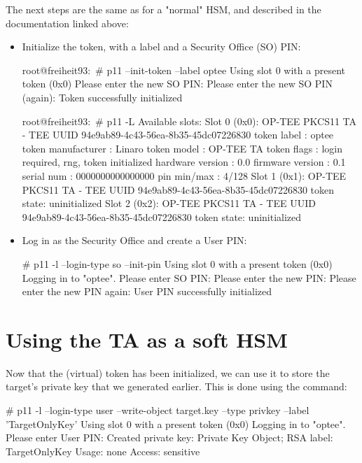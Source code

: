 The next steps are the same as for a "normal" HSM, and described in the documentation linked above:
\begin{itemize}
\item Initialize the token, with a label and a Security Office (SO) PIN:
\begin{bashinput}
root@freiheit93:~# p11 --init-token --label optee
Using slot 0 with a present token (0x0)
Please enter the new SO PIN: 
Please enter the new SO PIN (again): 
Token successfully initialized

root@freiheit93:~# p11 -L
Available slots:
Slot 0 (0x0): OP-TEE PKCS11 TA - TEE UUID 94e9ab89-4c43-56ea-8b35-45dc07226830
  token label        : optee
  token manufacturer : Linaro
  token model        : OP-TEE TA
  token flags        : login required, rng, token initialized
  hardware version   : 0.0
  firmware version   : 0.1
  serial num         : 0000000000000000
  pin min/max        : 4/128
Slot 1 (0x1): OP-TEE PKCS11 TA - TEE UUID 94e9ab89-4c43-56ea-8b35-45dc07226830
  token state:   uninitialized
Slot 2 (0x2): OP-TEE PKCS11 TA - TEE UUID 94e9ab89-4c43-56ea-8b35-45dc07226830
  token state:   uninitialized

\end{bashinput}
\item Log in as the Security Office and create a User PIN:
\begin{bashinput}
# p11 -l --login-type so --init-pin
Using slot 0 with a present token (0x0)
Logging in to "optee".
Please enter SO PIN: 
Please enter the new PIN: 
Please enter the new PIN again: 
User PIN successfully initialized
\end{bashinput}
\end{itemize}


\section{Using the TA as a soft HSM}

Now that the (virtual) token has been initialized, we can use it to store the target's private key
that we generated earlier. This is done using the  command:
\begin{bashinput}
# p11 -l --login-type user --write-object target.key --type privkey --label 'TargetOnlyKey'
Using slot 0 with a present token (0x0)
Logging in to "optee".
Please enter User PIN: 
Created private key:
Private Key Object; RSA 
  label:      TargetOnlyKey
  Usage:      none
  Access:     sensitive
\end{bashinput}


